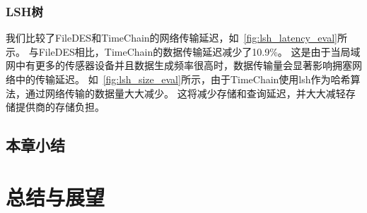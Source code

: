 \subsection{LSH树}
我们比较了FileDES和TimeChain的网络传输延迟，如~\autoref{fig:lsh_latency_eval}所示。
与FileDES相比，TimeChain的数据传输延迟减少了10.9\%。
这是由于当局域网中有更多的传感器设备并且数据生成频率很高时，数据传输量会显著影响拥塞网络中的传输延迟。
如~\autoref{fig:lsh_size_eval}所示，由于TimeChain使用lsh作为哈希算法，通过网络传输的数据量大大减少。
这将减少存储和查询延迟，并大大减轻存储提供商的存储负担。

\section{本章小结}


\chapter{总结与展望}
